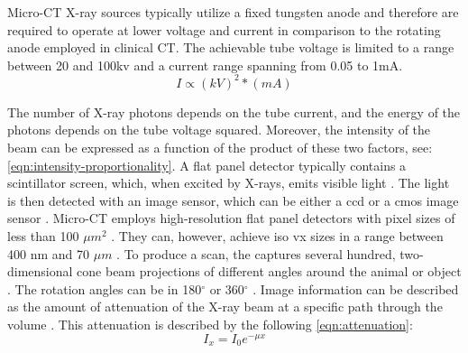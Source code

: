 \noindent
Micro-CT X-ray sources typically utilize a fixed tungsten anode
 and therefore are required to operate at lower voltage and current in comparison to the rotating anode employed in clinical CT.
The achievable tube voltage is limited to a range between 20 and 100\acrshort{kv} and a current range spanning from 0.05 to 1mA.
\begin{equation}\label{eqn:intensity-proportionality}
	I \propto (kV)^{2}*(mA)
\end{equation}

\noindent
The number of X-ray photons depends on the tube current, and the energy of the photons depends on the tube voltage squared.
Moreover, the intensity of the beam can be expressed as a function of the product of these two factors, see: \cref{eqn:intensity-proportionality}.
A flat panel detector typically contains a scintillator screen, which, when excited by X-rays, emits visible light \cite{babaComparisonFlatpanelDetector2002,ritmanCurrentStatusDevelopments2011,clarkMicroCTRodentsStateart2014}.
The light is then detected with an image sensor, which can be either a \acrfull{ccd} or a \acrfull{cmos} image sensor \cite{babaComparisonFlatpanelDetector2002}.
Micro-CT employs high-resolution flat panel detectors with pixel sizes of less than 100 $\mu m^{2}$ \cite{clarkAdvancesMicroCTImaging2021,clarkMicroCTRodentsStateart2014}.
They can, however, achieve \gls{iso} \gls{vx} sizes in a range between 400 nm and 70 $\mu m$ \cite{orhanMicrocomputedTomographyMicroCT2020}.
To produce a scan, the \mct\space captures several hundred, two-dimensional cone beam projections of different angles around the animal or object \cite{clarkMicroCTRodentsStateart2014,ritmanCurrentStatusDevelopments2011,clarkAdvancesMicroCTImaging2021}.
The rotation angles can be in 180$^{\circ}$ or 360$^{\circ}$ \cite{orhanMicrocomputedTomographyMicroCT2020}.
Image information can be described as the amount of attenuation of the X-ray beam at a specific path through the volume \cite{orhanMicrocomputedTomographyMicroCT2020}.
This attenuation is described by the following \cref{eqn:attenuation}:
\begin{equation}\label{eqn:attenuation}
	I_{x} = I_{0}e^{- \mu x}
\end{equation}


